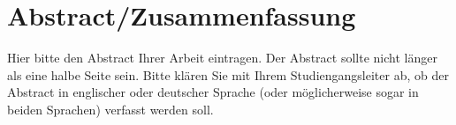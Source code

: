 \chapter*{Abstract/Zusammenfassung} %

Hier bitte den Abstract Ihrer Arbeit eintragen. Der Abstract sollte nicht länger als eine halbe Seite sein. Bitte klären Sie mit Ihrem Studiengangsleiter ab, ob der Abstract in englischer oder deutscher Sprache (oder möglicherweise sogar in beiden Sprachen) verfasst werden soll.
